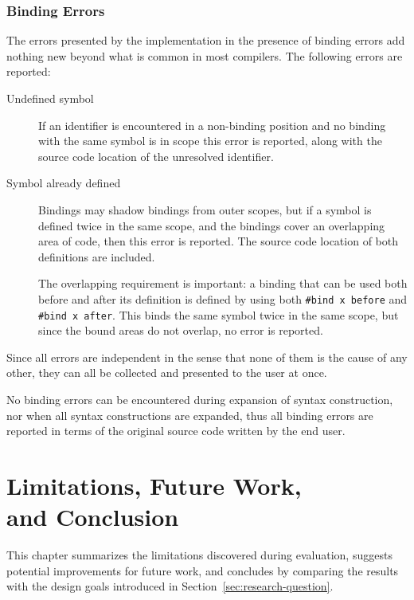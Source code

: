 \documentclass{kththesis}
\begin{document}
\subsection{Binding Errors}

The errors presented by the implementation in the presence of binding errors add nothing new beyond what is common in most compilers. The following errors are reported:

\begin{description}
  \item[Undefined symbol] If an identifier is encountered in a non-binding position and no binding with the same symbol is in scope this error is reported, along with the source code location of the unresolved identifier.

  \item[Symbol already defined] Bindings may shadow bindings from outer scopes, but if a symbol is defined twice in the same scope, and the bindings cover an overlapping area of code, then this error is reported. The source code location of both definitions are included.

  The overlapping requirement is important: a binding that can be used both before and after its definition is defined by using both \texttt{#bind x before} and \texttt{#bind x after}. This binds the same symbol twice in the same scope, but since the bound areas do not overlap, no error is reported.
\end{description}

Since all errors are independent in the sense that none of them is the cause of any other, they can all be collected and presented to the user at once.

No binding errors can be encountered during expansion of syntax construction, nor when all syntax constructions are expanded, thus all binding errors are reported in terms of the original source code written by the end user.

\chapter[Limitations, Future Work, and Conclusion]{Limitations, Future Work,\\and Conclusion}

This chapter summarizes the limitations discovered during evaluation, suggests potential improvements for future work, and concludes by comparing the results with the design goals introduced in Section~\ref{sec:research-question}.
\end{document}
